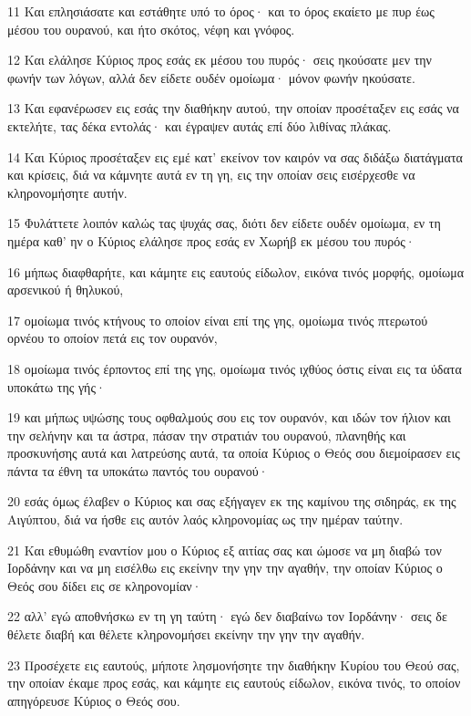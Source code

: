\par 11 Και επλησιάσατε και εστάθητε υπό το όρος· και το όρος εκαίετο με πυρ έως μέσου του ουρανού, και ήτο σκότος, νέφη και γνόφος.
\par 12 Και ελάλησε Κύριος προς εσάς εκ μέσου του πυρός· σεις ηκούσατε μεν την φωνήν των λόγων, αλλά δεν είδετε ουδέν ομοίωμα· μόνον φωνήν ηκούσατε.
\par 13 Και εφανέρωσεν εις εσάς την διαθήκην αυτού, την οποίαν προσέταξεν εις εσάς να εκτελήτε, τας δέκα εντολάς· και έγραψεν αυτάς επί δύο λιθίνας πλάκας.
\par 14 Και Κύριος προσέταξεν εις εμέ κατ' εκείνον τον καιρόν να σας διδάξω διατάγματα και κρίσεις, διά να κάμνητε αυτά εν τη γη, εις την οποίαν σεις εισέρχεσθε να κληρονομήσητε αυτήν.
\par 15 Φυλάττετε λοιπόν καλώς τας ψυχάς σας, διότι δεν είδετε ουδέν ομοίωμα, εν τη ημέρα καθ' ην ο Κύριος ελάλησε προς εσάς εν Χωρήβ εκ μέσου του πυρός·
\par 16 μήπως διαφθαρήτε, και κάμητε εις εαυτούς είδωλον, εικόνα τινός μορφής, ομοίωμα αρσενικού ή θηλυκού,
\par 17 ομοίωμα τινός κτήνους το οποίον είναι επί της γης, ομοίωμα τινός πτερωτού ορνέου το οποίον πετά εις τον ουρανόν,
\par 18 ομοίωμα τινός έρποντος επί της γης, ομοίωμα τινός ιχθύος όστις είναι εις τα ύδατα υποκάτω της γής·
\par 19 και μήπως υψώσης τους οφθαλμούς σου εις τον ουρανόν, και ιδών τον ήλιον και την σελήνην και τα άστρα, πάσαν την στρατιάν του ουρανού, πλανηθής και προσκυνήσης αυτά και λατρεύσης αυτά, τα οποία Κύριος ο Θεός σου διεμοίρασεν εις πάντα τα έθνη τα υποκάτω παντός του ουρανού·
\par 20 εσάς όμως έλαβεν ο Κύριος και σας εξήγαγεν εκ της καμίνου της σιδηράς, εκ της Αιγύπτου, διά να ήσθε εις αυτόν λαός κληρονομίας ως την ημέραν ταύτην.
\par 21 Και εθυμώθη εναντίον μου ο Κύριος εξ αιτίας σας και ώμοσε να μη διαβώ τον Ιορδάνην και να μη εισέλθω εις εκείνην την γην την αγαθήν, την οποίαν Κύριος ο Θεός σου δίδει εις σε κληρονομίαν·
\par 22 αλλ' εγώ αποθνήσκω εν τη γη ταύτη· εγώ δεν διαβαίνω τον Ιορδάνην· σεις δε θέλετε διαβή και θέλετε κληρονομήσει εκείνην την γην την αγαθήν.
\par 23 Προσέχετε εις εαυτούς, μήποτε λησμονήσητε την διαθήκην Κυρίου του Θεού σας, την οποίαν έκαμε προς εσάς, και κάμητε εις εαυτούς είδωλον, εικόνα τινός, το οποίον απηγόρευσε Κύριος ο Θεός σου.

